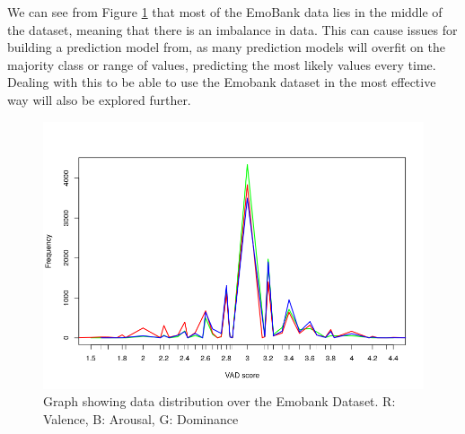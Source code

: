 We can see from Figure \ref{dist:vad} that most of the EmoBank data lies in the middle of the dataset, meaning that there is an imbalance in data. This can cause issues for building a prediction model from, as many prediction models will overfit on the majority class or range of values, predicting the most likely values every time. Dealing with this to be able to use the Emobank dataset in the most effective way will also be explored further.

\begin{figure}[h]
\centering
\includegraphics[scale=0.5]{graphs/VADdistribution.png}
\caption{Graph showing data distribution over the Emobank Dataset. R: Valence, B: Arousal, G: Dominance}
\label{dist:vad}
\end{figure}
